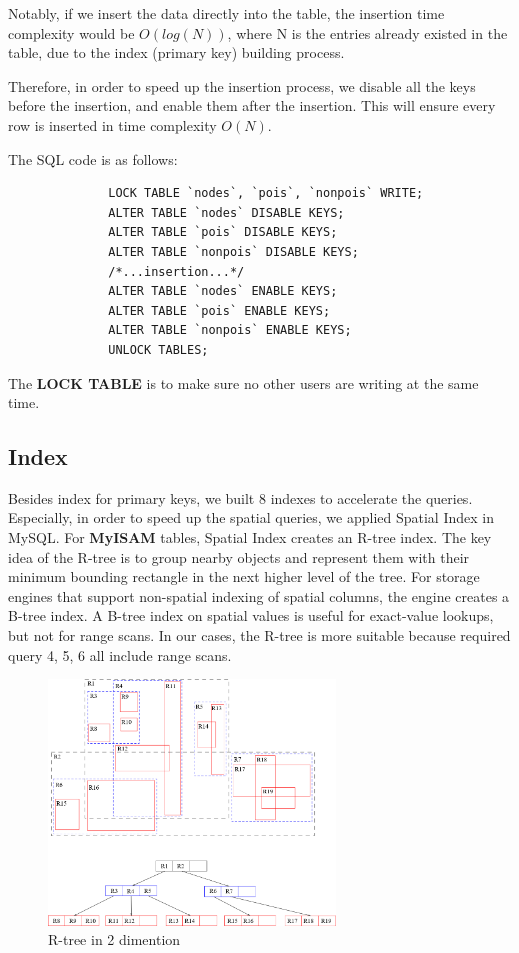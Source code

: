 \documentclass[final,1p,times]{elsarticle}
\begin{document}
Notably, if we insert the data directly into the table, the insertion time complexity would be $O(log(N))$, where N is the entries already existed in the table, due to the index (primary key) building process.

Therefore, in order to speed up the insertion process, we disable all the keys before the insertion, and enable them after the insertion. This will ensure every row is inserted in time complexity $O(N)$.

The SQL code is as follows:

\begin{verbatim}
              LOCK TABLE `nodes`, `pois`, `nonpois` WRITE;
              ALTER TABLE `nodes` DISABLE KEYS;
              ALTER TABLE `pois` DISABLE KEYS;
              ALTER TABLE `nonpois` DISABLE KEYS;
              /*...insertion...*/
              ALTER TABLE `nodes` ENABLE KEYS;
              ALTER TABLE `pois` ENABLE KEYS;
              ALTER TABLE `nonpois` ENABLE KEYS;
              UNLOCK TABLES;
\end{verbatim}

The \textbf{LOCK TABLE} is to make sure no other users are writing at the same time.
\subsection{Index}
Besides index for primary keys, we built 8 indexes to accelerate the queries. Especially, in order to speed up the spatial queries, we applied Spatial Index in MySQL. For \textbf{MyISAM} tables, Spatial Index creates an R-tree index. The key idea of the R-tree is to group nearby objects and represent them with their minimum bounding rectangle in the next higher level of the tree. For storage engines that support non-spatial indexing of spatial columns, the engine creates a B-tree index. A B-tree index on spatial values is useful for exact-value lookups, but not for range scans. In our cases, the R-tree is more suitable because required query 4, 5, 6 all include range scans.

\begin{figure}[thpb]
      \centering
      \includegraphics[width=3in]{R-tree.png}
      \caption{R-tree in 2 dimention}
      \label{fig:Rtree}
\end{figure}
\end{document}
